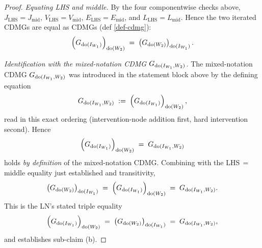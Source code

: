 \documentclass[main]{subfiles}
\begin{document}
\begin{proof}
\smallskip\noindent\emph{Equating LHS and middle.}
By the four componentwise checks above, $J_{\mathrm{LHS}} = J_{\mathrm{mid}}$, $V_{\mathrm{LHS}} = V_{\mathrm{mid}}$, $E_{\mathrm{LHS}} = E_{\mathrm{mid}}$, and $L_{\mathrm{LHS}} = L_{\mathrm{mid}}$. Hence the two iterated CDMGs are equal as CDMGs (def \ref{def-cdmg}):
\[
    \left ( G_{\operatorname{do}(I_{W_1})} \right )_{\operatorname{do}(W_2)} \;=\; \left ( G_{\operatorname{do}(W_2)} \right )_{\operatorname{do}(I_{W_1})}.
\]

\smallskip\noindent\emph{Identification with the mixed-notation CDMG $G_{\operatorname{do}(I_{W_1}, W_2)}$.}
The mixed-notation CDMG $G_{\operatorname{do}(I_{W_1}, W_2)}$ was introduced in the statement block above by the defining equation
\[
    G_{\operatorname{do}(I_{W_1}, W_2)} \;:=\; \left ( G_{\operatorname{do}(I_{W_1})} \right )_{\operatorname{do}(W_2)},
\]
read in this exact ordering (intervention-node addition first, hard intervention second). Hence
\[
    \left ( G_{\operatorname{do}(I_{W_1})} \right )_{\operatorname{do}(W_2)} \;=\; G_{\operatorname{do}(I_{W_1}, W_2)}
\]
holds \emph{by definition} of the mixed-notation CDMG. Combining with the LHS\,$=$\,middle equality just established and transitivity,
\[
    \left ( G_{\operatorname{do}(W_2)} \right )_{\operatorname{do}(I_{W_1})} \;=\; \left ( G_{\operatorname{do}(I_{W_1})} \right )_{\operatorname{do}(W_2)} \;=\; G_{\operatorname{do}(I_{W_1}, W_2)}.
\]
This is the LN's stated triple equality
\[
    \left ( G_{\operatorname{do}(I_{W_1})} \right )_{\operatorname{do}(W_2)} \;=\; \left ( G_{\operatorname{do}(W_2)} \right )_{\operatorname{do}(I_{W_1})} \;=\; G_{\operatorname{do}(I_{W_1}, W_2)},
\]
and establishes sub-claim (b).
\end{proof}
\end{document}
